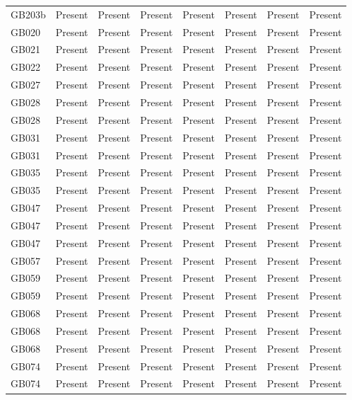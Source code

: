 \begin{longtable}{p{1.5cm}p{2.5cm}p{2.5cm}p{2.5cm}p{2.5cm}p{2.5cm}p{2.5cm}p{2.5cm}}
  GB203b & Present & Present & Present & Present & Present & Present & Present \\ 
  GB020 & Present & Present & Present & Present & Present & Present & Present \\ 
  GB021 & Present & Present & Present & Present & Present & Present & Present \\ 
  GB022 & Present & Present & Present & Present & Present & Present & Present \\ 
  GB027 & Present & Present & Present & Present & Present & Present & Present \\ 
  GB028 & Present & Present & Present & Present & Present & Present & Present \\ 
  GB028 & Present & Present & Present & Present & Present & Present & Present \\ 
  GB031 & Present & Present & Present & Present & Present & Present & Present \\ 
  GB031 & Present & Present & Present & Present & Present & Present & Present \\ 
  GB035 & Present & Present & Present & Present & Present & Present & Present \\ 
  GB035 & Present & Present & Present & Present & Present & Present & Present \\ 
  GB047 & Present & Present & Present & Present & Present & Present & Present \\ 
  GB047 & Present & Present & Present & Present & Present & Present & Present \\ 
  GB047 & Present & Present & Present & Present & Present & Present & Present \\ 
  GB057 & Present & Present & Present & Present & Present & Present & Present \\ 
  GB059 & Present & Present & Present & Present & Present & Present & Present \\ 
  GB059 & Present & Present & Present & Present & Present & Present & Present \\ 
  GB068 & Present & Present & Present & Present & Present & Present & Present \\ 
  GB068 & Present & Present & Present & Present & Present & Present & Present \\ 
  GB068 & Present & Present & Present & Present & Present & Present & Present \\ 
  GB074 & Present & Present & Present & Present & Present & Present & Present \\ 
  GB074 & Present & Present & Present & Present & Present & Present & Present \\ 

\end{longtable}
